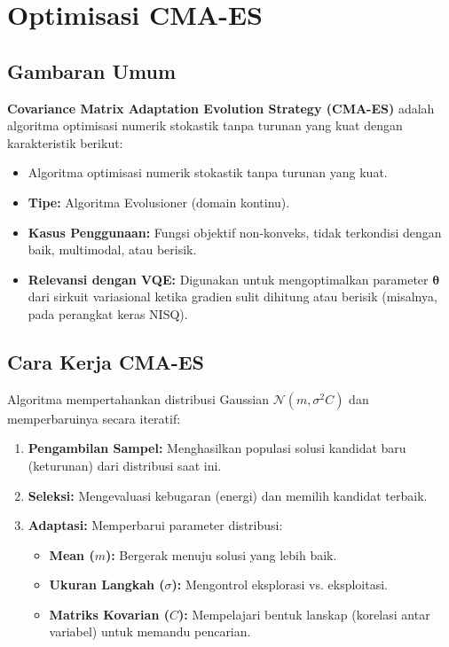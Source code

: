 \section{Optimisasi CMA-ES}

\subsection{Gambaran Umum}

\textbf{Covariance Matrix Adaptation Evolution Strategy (CMA-ES)} adalah algoritma optimisasi numerik stokastik tanpa turunan yang kuat dengan karakteristik berikut:

\begin{itemize}
    \item Algoritma optimisasi numerik stokastik tanpa turunan yang kuat.
    \item \textbf{Tipe:} Algoritma Evolusioner (domain kontinu).
    \item \textbf{Kasus Penggunaan:} Fungsi objektif non-konveks, tidak terkondisi dengan baik, multimodal, atau berisik.
    \item \textbf{Relevansi dengan VQE:} Digunakan untuk mengoptimalkan parameter $\boldsymbol{\theta}$ dari sirkuit variasional ketika gradien sulit dihitung atau berisik (misalnya, pada perangkat keras NISQ).
\end{itemize}

\subsection{Cara Kerja CMA-ES}

Algoritma mempertahankan distribusi Gaussian $\mathcal{N}(m, \sigma^2 C)$ dan memperbaruinya secara iteratif:

\begin{enumerate}
    \item \textbf{Pengambilan Sampel:} Menghasilkan populasi solusi kandidat baru (keturunan) dari distribusi saat ini.
    \item \textbf{Seleksi:} Mengevaluasi kebugaran (energi) dan memilih kandidat terbaik.
    \item \textbf{Adaptasi:} Memperbarui parameter distribusi:
        \begin{itemize}
            \item \textbf{Mean ($m$):} Bergerak menuju solusi yang lebih baik.
            \item \textbf{Ukuran Langkah ($\sigma$):} Mengontrol eksplorasi vs. eksploitasi.
            \item \textbf{Matriks Kovarian ($C$):} Mempelajari bentuk lanskap (korelasi antar variabel) untuk memandu pencarian.
        \end{itemize}
\end{enumerate}

